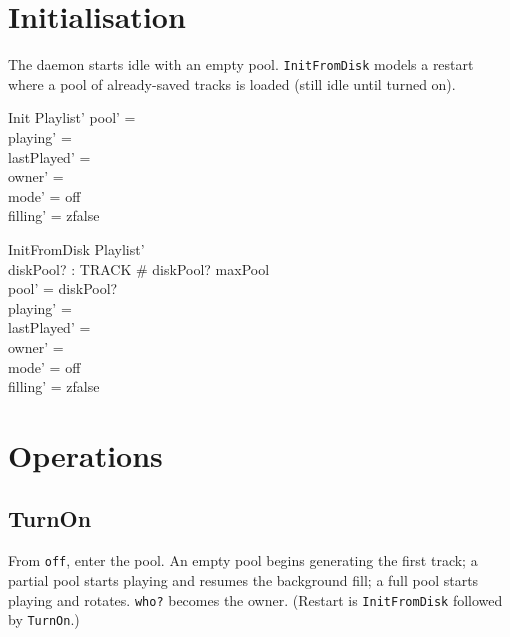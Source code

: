 \documentclass[a4paper,10pt,fleqn]{article}
\begin{document}
\section{Initialisation}

The daemon starts idle with an empty pool. \texttt{InitFromDisk}
models a restart where a pool of already-saved tracks is loaded (still
idle until turned on).

\begin{schema}{Init}
  Playlist'
  \where
  pool' = \emptyset \\
  playing' = \emptyset \\
  lastPlayed' = \emptyset \\
  owner' = \emptyset \\
  mode' = off \\
  filling' = zfalse
\end{schema}

\begin{schema}{InitFromDisk}
  Playlist' \\
  diskPool? : \power TRACK
  \where
  \# diskPool? \leq maxPool \\
  pool' = diskPool? \\
  playing' = \emptyset \\
  lastPlayed' = \emptyset \\
  owner' = \emptyset \\
  mode' = off \\
  filling' = zfalse
\end{schema}

\section{Operations}

\subsection{TurnOn}

From \texttt{off}, enter the pool. An empty pool begins generating the
first track; a partial pool starts playing and resumes the background
fill; a full pool starts playing and rotates. \texttt{who?} becomes the
owner. (Restart is \texttt{InitFromDisk} followed by \texttt{TurnOn}.)
\end{document}
